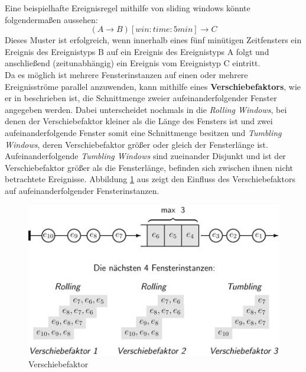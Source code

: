 \documentclass{acm_proc_article-sp}
\begin{document}
Eine beispielhafte Ereignisregel mithilfe von sliding windows könnte folgendermaßen 
aussehen:
$$(A \rightarrow B)[win:time:5min] \rightarrow C$$
Dieses Muster ist erfolgreich, wenn innerhalb eines fünf minütigen Zeitfensters ein 
Ereignis des Ereignistyps B auf ein Ereignis des Ereignistyps A folgt und anschließend 
(zeitunabhängig) ein Ereignis vom Ereignistyp C eintritt.\\
Da es möglich ist mehrere Fensterinstanzen auf einen oder mehrere Ereignisströme parallel 
anzuwenden, kann mithilfe eines \textbf{Verschiebefaktors}\label{kap:verschiebefaktor}, 
wie er in \cite{hedtstuck} beschrieben 
ist, die Schnittmenge zweier aufeinanderfolgender Fenster angegeben werden. Dabei 
unterscheidet \cite{hedtstuck} nochmals in die \textit{Rolling Windows}, bei denen der 
Verschiebefaktor kleiner als die Länge des Fensters ist und zwei aufeinanderfolgende 
Fenster somit eine Schnittmenge besitzen und \textit{Tumbling Windows}, deren 
Verschiebefaktor größer oder gleich der Fensterlänge ist. Aufeinanderfolgende 
\textit{Tumbling Windows} sind zueinander Disjunkt und ist der Verschiebefaktor größer 
als die Fensterlänge, befinden sich zwischen ihnen nicht betrachtete Ereignisse. 
Abbildung \ref{img:factors} aus \cite{hedtstuck} zeigt den Einfluss des 
Verschiebefaktors auf aufeinanderfolgender Fensterinstanzen.

\begin{figure}[H]
    \centering
    \includegraphics[width=\linewidth]{img/factor-hedstuck}
    \caption{Verschiebefaktor}
    \label{img:factors}
\end{figure}
\end{document}
